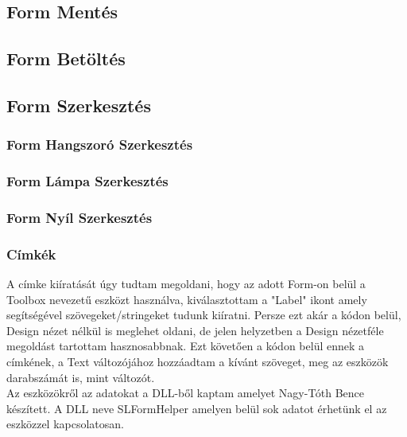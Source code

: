 \documentclass[tocnopagenum]{thesis-ekf}
\theoremstyle{definition}
\theoremstyle{remark}
\begin{document}
	\subsection{Form Mentés}
	
	\subsection{Form Betöltés}
	\subsection{Form Szerkesztés}
	\subsubsection{Form Hangszoró Szerkesztés}
	\subsubsection{Form Lámpa Szerkesztés}
	\subsubsection{Form Nyíl Szerkesztés}
	\subsubsection*{Címkék}
	A címke kiíratását úgy tudtam megoldani, hogy az adott Form-on belül a Toolbox nevezetű eszközt használva, kiválasztottam a "Label" ikont amely segítségével szövegeket/stringeket tudunk kiíratni. Persze ezt akár a kódon belül, Design nézet nélkül is meglehet oldani, de jelen helyzetben a Design nézetféle megoldást tartottam hasznosabbnak. Ezt követően a kódon belül ennek a címkének, a Text változójához hozzáadtam a kívánt szöveget, meg az eszközök darabszámát is, mint változót.
	\\
	Az eszközökről az adatokat a DLL-ből kaptam amelyet Nagy-Tóth Bence készített. A DLL neve SLFormHelper amelyen belül sok adatot érhetünk el az eszközzel kapcsolatosan. %
	
	

\end{document}
